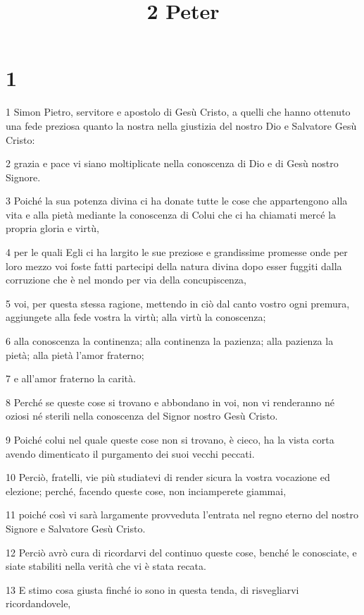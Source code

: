 

\title{2 Peter}


\chapter{1}

\par 1 Simon Pietro, servitore e apostolo di Gesù Cristo, a quelli che hanno ottenuto una fede preziosa quanto la nostra nella giustizia del nostro Dio e Salvatore Gesù Cristo:
\par 2 grazia e pace vi siano moltiplicate nella conoscenza di Dio e di Gesù nostro Signore.
\par 3 Poiché la sua potenza divina ci ha donate tutte le cose che appartengono alla vita e alla pietà mediante la conoscenza di Colui che ci ha chiamati mercé la propria gloria e virtù,
\par 4 per le quali Egli ci ha largito le sue preziose e grandissime promesse onde per loro mezzo voi foste fatti partecipi della natura divina dopo esser fuggiti dalla corruzione che è nel mondo per via della concupiscenza,
\par 5 voi, per questa stessa ragione, mettendo in ciò dal canto vostro ogni premura, aggiungete alla fede vostra la virtù; alla virtù la conoscenza;
\par 6 alla conoscenza la continenza; alla continenza la pazienza; alla pazienza la pietà; alla pietà l'amor fraterno;
\par 7 e all'amor fraterno la carità.
\par 8 Perché se queste cose si trovano e abbondano in voi, non vi renderanno né oziosi né sterili nella conoscenza del Signor nostro Gesù Cristo.
\par 9 Poiché colui nel quale queste cose non si trovano, è cieco, ha la vista corta avendo dimenticato il purgamento dei suoi vecchi peccati.
\par 10 Perciò, fratelli, vie più studiatevi di render sicura la vostra vocazione ed elezione; perché, facendo queste cose, non inciamperete giammai,
\par 11 poiché così vi sarà largamente provveduta l'entrata nel regno eterno del nostro Signore e Salvatore Gesù Cristo.
\par 12 Perciò avrò cura di ricordarvi del continuo queste cose, benché le conosciate, e siate stabiliti nella verità che vi è stata recata.
\par 13 E stimo cosa giusta finché io sono in questa tenda, di risvegliarvi ricordandovele,
